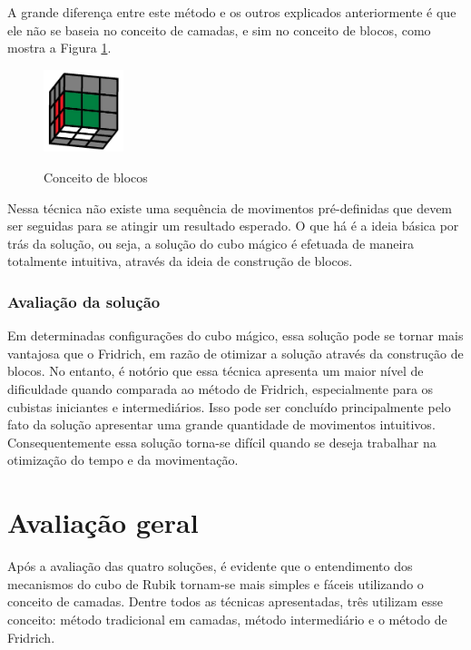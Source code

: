 A grande diferença entre este método e os outros explicados anteriormente é que ele não se baseia no conceito de camadas, e sim no conceito de blocos, como mostra a Figura \ref{fig:figconcesdadadasdiBlo}.


\begin{figure}[!htb]
    \centering
    {
        \includegraphics[height=2.4cm]{imagens/conceitoBloco.jpg}
        \label{figFront}
    }
    
\caption{Conceito de blocos}
\label{fig:figconcesdadadasdiBlo}
\end{figure}



Nessa técnica não existe uma sequência de movimentos pré-definidas que devem ser seguidas para se atingir um resultado esperado. O que há é a ideia básica por trás da solução, ou seja, a solução do cubo mágico é efetuada de maneira totalmente intuitiva, através da ideia de construção de blocos. 

\subsubsection{Avaliação da solução}

Em determinadas configurações do cubo mágico, essa solução pode se tornar mais vantajosa que o Fridrich, em razão de otimizar a solução através da construção de blocos. No entanto, é notório que essa técnica apresenta um maior nível de dificuldade quando comparada ao método de Fridrich, especialmente para os cubistas iniciantes e intermediários. Isso pode ser concluído principalmente pelo fato da solução apresentar uma grande quantidade de movimentos intuitivos. Consequentemente essa solução torna-se difícil quando se deseja trabalhar na otimização do tempo e da movimentação.



\section{Avaliação geral}


Após a avaliação das quatro soluções, é evidente que o entendimento dos mecanismos do cubo de Rubik tornam-se mais simples e fáceis utilizando o conceito de camadas. Dentre todos as técnicas apresentadas, três utilizam esse conceito: método tradicional em camadas, método intermediário e o método de Fridrich.


